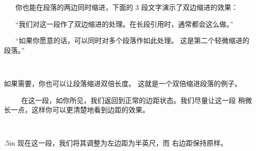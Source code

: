 ~%
~%
你也能在段落的两边同时缩进，下面的 3 段文字演示了双边缩进的效果：

\smallskip %
{\narrower
~%
~%
``我们对这一段作了双边缩进的处理。在长段引用时，通常都会这么做。''

~%
~%
``如果你愿意的话，可以同时对多个段落作如此处理。
这是第二个轻微缩进的段落。''\par}

~%
~%
~%
{\narrower \narrower 如果需要，你也可以让段落缩进双倍长度。
这就是一个双倍缩进段落的例子。\par}
\vskip 1pc %
~%
~%
~%
在这一段，如你所见，我们返回到正常的边距状态。我们尽量让这一段
稍微长一点，这样你可以更清楚地看到边距的效果。

~%
~%
{\leftskip .5in 现在这一段，我们将其调整为左边距为半英尺，而
右边距保持原样。\par}

